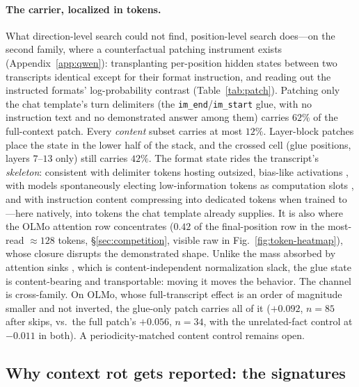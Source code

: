 \documentclass{article}
\begin{document}
\paragraph{The carrier, localized in tokens.}
What direction-level search could not find, position-level search does---on the second family,
where a counterfactual patching instrument exists (Appendix~\ref{app:qwen}): transplanting
per-position hidden states between two transcripts identical except for their format
instruction, and reading out the instructed formats' log-probability contrast
(Table~\ref{tab:patch}). Patching only the chat template's turn delimiters (the
\texttt{im\_end}/\texttt{im\_start} glue, with no instruction text and no demonstrated answer
among them) carries $62\%$ of the full-context patch. Every \emph{content} subset carries at
most $12\%$. Layer-block patches place the state in the lower half of the stack, and the
crossed cell (glue positions, layers $7$--$13$ only) still carries $42\%$. The
format state rides the transcript's \emph{skeleton}: consistent with delimiter tokens hosting
outsized, bias-like activations \citep{sun2024massiveactivations}, with models spontaneously
electing low-information tokens as computation slots \citep{darcet2023registers}, and with
instruction content compressing into dedicated tokens when trained to
\citep{mu2023gist}---here natively, into tokens the chat template already supplies. It is also
where the OLMo attention row concentrates ($0.42$ of the final-position row in the most-read
${\approx}128$ tokens,
\S\ref{sec:competition}, visible raw in Fig.~\ref{fig:token-heatmap}), whose closure disrupts
the demonstrated shape. Unlike the mass absorbed by attention
sinks \citep{xiao2023streamingllm,gu2024attentionsink}, which is content-independent
normalization slack, the glue state is content-bearing and transportable: moving it moves
the behavior. The channel is cross-family. On OLMo, whose full-transcript effect is an order
of magnitude smaller and not inverted, the glue-only patch carries all of it
($+0.092$, $n{=}85$ after skips, vs.\ the full patch's $+0.056$, $n{=}34$, with the
unrelated-fact control at $-0.011$
in both). A periodicity-matched content control remains open.

\subsection{Why context rot gets reported: the signatures}
\label{sec:signatures}
\end{document}
